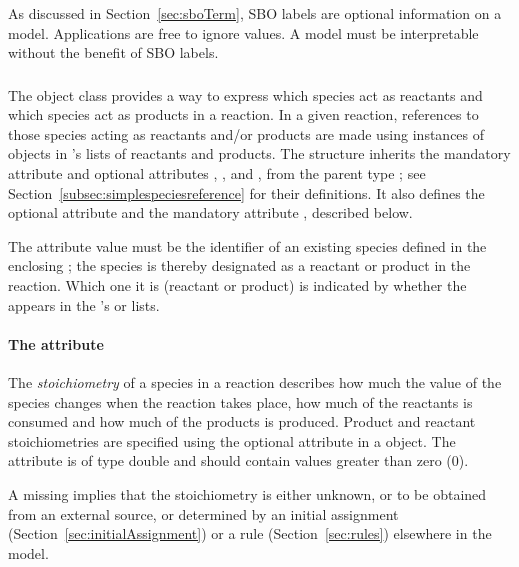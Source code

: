 As discussed in Section~\ref{sec:sboTerm}, SBO labels are optional
information on a model.  Applications are free to ignore
 values.  A model must be interpretable without the
benefit of SBO labels.

\subsubsection{}
\label{subsec:speciesreference}

The \Reaction object class provides a way to express which species
act as reactants and which species act as products in a reaction.
In a given reaction, references to those species acting as
reactants and/or products are made using instances of
\SpeciesReference objects in \Reaction's lists of reactants and
products.  The \SpeciesReference structure inherits the mandatory
attribute  and optional attributes ,
, and , from the parent type
\SimpleSpeciesReference; see
Section~\ref{subsec:simplespeciesreference} for their definitions.
It also defines the optional attribute  and 
the mandatory attribute , described below.

The  attribute value must be the
identifier of an existing species defined in the enclosing \Model;
the species is thereby designated as a reactant or product in the
reaction.  Which one it is (\ie reactant or product) is indicated
by whether the \SpeciesReference appears in the \Reaction's
 or  lists.


\paragraph{The  attribute}

The {\em stoichiometry} of a species in a reaction describes how much 
the value of the species changes when the reaction takes place, \ie 
how much of the reactants is consumed and how much of the products is produced.
Product and reactant stoichiometries are specified using
the optional  attribute 
in a \SpeciesReference object.  The 
attribute is of type double and should contain values greater than
zero (0). 

A missing  implies that the stoichiometry is either unknown, 
or to be obtained from an external source, or determined by an initial
assignment (Section~\ref{sec:initialAssignment}) or a rule
(Section~\ref{sec:rules}) elsewhere in the model.


